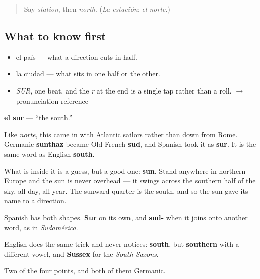\label{lesson:ES-C347-sur}



\begin{quote}
Say \emph{station}, then \emph{north}. (\emph{La estación}; \emph{el norte}.)
\end{quote}

\subsection*{What to know first}
\begin{itemize}
\raggedright
  \item el país — what a direction cuts in half.
  \item la ciudad — what sits in one half or the other.
\end{itemize}

\begin{sounds}
\begin{itemize}
\raggedright
  \item \emph{SUR}, one beat, and the \emph{r} at the end is a single tap rather than a roll. $\to$ pronunciation reference
\end{itemize}
\end{sounds}

\begin{cousinweb}
\textbf{el sur} — \textquotedblleft{}the south.\textquotedblright{}

Like \emph{norte}, this came in with Atlantic sailors rather than down from Rome. Germanic \textbf{sunthaz} became Old French \textbf{sud}, and Spanish took it as \textbf{sur}. It is the same word as English \textbf{south}.

What is inside it is a guess, but a good one: \textbf{sun}. Stand anywhere in northern Europe and the sun is never overhead — it swings across the southern half of the sky, all day, all year. The sunward quarter is the south, and so the sun gave its name to a direction.

Spanish has both shapes. \textbf{Sur} on its own, and \textbf{sud-} when it joins onto another word, as in \emph{Sudamérica}.

English does the same trick and never notices: \textbf{south}, but \textbf{southern} with a different vowel, and \textbf{Sussex} for the \emph{South Saxons}.
\end{cousinweb}

\begin{grammarlens}[title={What you've built}]
Two of the four points, and both of them Germanic.
\end{grammarlens}

